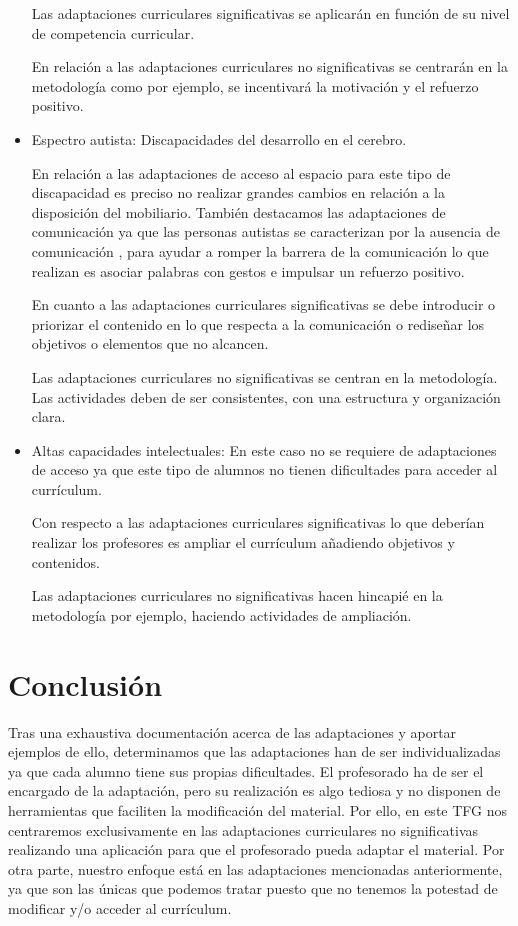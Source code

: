 \begin{itemize}
    Las adaptaciones curriculares significativas se aplicarán en función de su nivel de competencia curricular. 

    En relación a las adaptaciones curriculares no significativas se centrarán en la metodología como por ejemplo, se incentivará la motivación y el refuerzo positivo.
    
    \item Espectro autista: Discapacidades del desarrollo en el cerebro. 
    
    En relación a las adaptaciones de acceso al espacio para este tipo de discapacidad es preciso no realizar grandes cambios en relación a la disposición del mobiliario. También destacamos las adaptaciones de comunicación ya que las personas autistas se caracterizan por la ausencia de comunicación , para ayudar a romper la barrera de la comunicación lo que realizan es asociar palabras con gestos e impulsar un refuerzo positivo.

    En cuanto a las adaptaciones curriculares significativas se debe introducir o priorizar el contenido en lo que respecta a la  comunicación o rediseñar los objetivos o elementos que no alcancen.

   Las adaptaciones curriculares no significativas se centran en la metodología. Las actividades deben de ser consistentes, con una estructura y organización clara.

    \item Altas capacidades intelectuales: En este caso no se requiere de adaptaciones de acceso ya que  este tipo de alumnos no tienen dificultades para acceder al currículum. 
    
    Con respecto a las adaptaciones curriculares significativas lo que deberían realizar los profesores es ampliar el currículum añadiendo objetivos y contenidos.

   Las adaptaciones curriculares no significativas hacen hincapié en la metodología por ejemplo, haciendo actividades de ampliación.

\end{itemize}

\section{Conclusión}
Tras una exhaustiva documentación acerca de las adaptaciones y aportar ejemplos de ello, determinamos que las adaptaciones han de ser individualizadas ya que cada alumno tiene sus propias dificultades. El profesorado ha de ser el encargado de la adaptación, pero su realización es algo tediosa y no disponen de herramientas que faciliten la modificación del material. Por ello, en este TFG nos centraremos exclusivamente en las adaptaciones curriculares no significativas realizando una aplicación para que el profesorado pueda adaptar el material. Por otra parte, nuestro enfoque está en las adaptaciones mencionadas anteriormente, ya que son las únicas que podemos tratar puesto que no tenemos la potestad de modificar y/o acceder al currículum. 